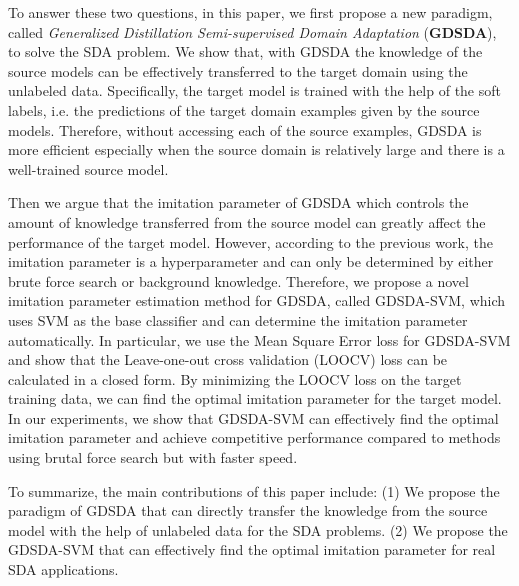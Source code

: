 To answer these two questions, in this paper, we first propose a new paradigm, called \textit{Generalized Distillation Semi-supervised Domain Adaptation} (\textbf{GDSDA}), to solve the SDA problem. 
We show that, with GDSDA the knowledge of the source models can be effectively transferred to the target domain using the unlabeled data. Specifically, the target model is trained with the help of the soft labels, i.e. the predictions of the target domain examples given by the source models. Therefore, without accessing each of the source examples, GDSDA is more efficient especially when the source domain is relatively large and there is a well-trained source model.

Then we argue that the imitation parameter of GDSDA which controls the amount of knowledge transferred from the source model can greatly affect the performance of the target model.
However, according to the previous work\mbox{\cite{lopez2015unifying,Tzeng_2015_ICCV}}, the imitation parameter is a hyperparameter and can only be determined by either brute force search or background knowledge. 
Therefore, we propose a novel imitation parameter estimation method for GDSDA, called GDSDA-SVM, which uses SVM as the base classifier and can determine the imitation parameter automatically. In particular, we use the Mean Square Error loss for GDSDA-SVM and show that the Leave-one-out cross validation (LOOCV) loss can be calculated in a closed form. By minimizing the LOOCV loss on the target training data, we can find the optimal imitation parameter for the target model. In our experiments, we show that GDSDA-SVM can effectively find the optimal imitation parameter and achieve competitive performance compared to methods using brutal force search but with faster speed. 

To summarize, the main contributions of this paper include: (1) We propose the paradigm of GDSDA that can directly transfer the knowledge from the source model with the help of unlabeled data for the SDA problems. (2) We propose the GDSDA-SVM that can effectively find the optimal imitation parameter for real SDA applications.

